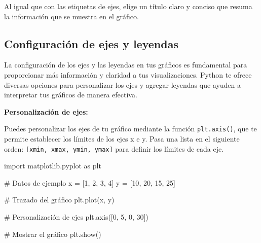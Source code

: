 \documentclass[
  a4paper,
]{article}
\newenvironment{Shaded}{}{}
\newcommand{\CommentTok}[1]{\textcolor[rgb]{0.42,0.45,0.49}{#1}}
\newcommand{\DecValTok}[1]{\textcolor[rgb]{0.00,0.36,0.77}{#1}}
\newcommand{\ImportTok}[1]{\textcolor[rgb]{0.01,0.18,0.38}{#1}}
\newcommand{\NormalTok}[1]{\textcolor[rgb]{0.14,0.16,0.18}{#1}}
\newcommand{\OperatorTok}[1]{\textcolor[rgb]{0.14,0.16,0.18}{#1}}
\begin{document}
Al igual que con las etiquetas de ejes, elige un título claro y conciso
que resuma la información que se muestra en el gráfico.

\hypertarget{configuraciuxf3n-de-ejes-y-leyendas}{%
\subsection{Configuración de ejes y
leyendas}\label{configuraciuxf3n-de-ejes-y-leyendas}}

La configuración de los ejes y las leyendas en tus gráficos es
fundamental para proporcionar más información y claridad a tus
visualizaciones. Python te ofrece diversas opciones para personalizar
los ejes y agregar leyendas que ayuden a interpretar tus gráficos de
manera efectiva.

\textbf{Personalización de ejes:}

Puedes personalizar los ejes de tu gráfico mediante la función
\texttt{plt.axis()}, que te permite establecer los límites de los ejes x
e y. Pasa una lista en el siguiente orden:
\texttt{{[}xmin,\ xmax,\ ymin,\ ymax{]}} para definir los límites de
cada eje.

\begin{Shaded}
\begin{Highlighting}[]
\ImportTok{import}\NormalTok{ matplotlib.pyplot }\ImportTok{as}\NormalTok{ plt}

\CommentTok{\# Datos de ejemplo}
\NormalTok{x }\OperatorTok{=}\NormalTok{ [}\DecValTok{1}\NormalTok{, }\DecValTok{2}\NormalTok{, }\DecValTok{3}\NormalTok{, }\DecValTok{4}\NormalTok{]}
\NormalTok{y }\OperatorTok{=}\NormalTok{ [}\DecValTok{10}\NormalTok{, }\DecValTok{20}\NormalTok{, }\DecValTok{15}\NormalTok{, }\DecValTok{25}\NormalTok{]}

\CommentTok{\# Trazado del gráfico}
\NormalTok{plt.plot(x, y)}

\CommentTok{\# Personalización de ejes}
\NormalTok{plt.axis([}\DecValTok{0}\NormalTok{, }\DecValTok{5}\NormalTok{, }\DecValTok{0}\NormalTok{, }\DecValTok{30}\NormalTok{])}

\CommentTok{\# Mostrar el gráfico}
\NormalTok{plt.show()}
\end{Highlighting}
\end{Shaded}
\end{document}
